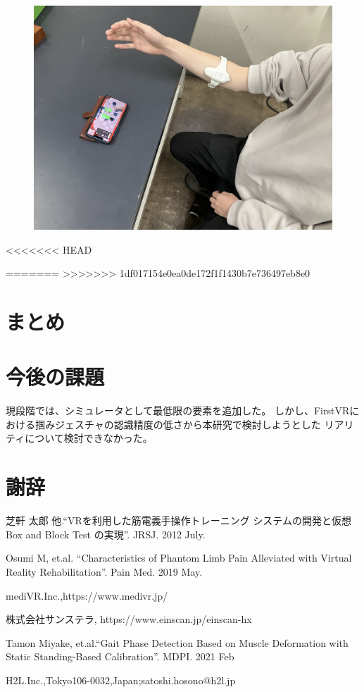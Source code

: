\documentclass{ltjsreport}
\begin{document}
		\begin{figure}[H]
		\centering
		\includegraphics[width = 12cm]{../figs/IMG_6323.jpg}
		\caption{}
		\label{}
		\end{figure}
<<<<<<< HEAD

=======
>>>>>>> 1df017154e0ea0de172f1f1430b7e736497eb8e0

\chapter{まとめ}

\chapter{今後の課題}
	現段階では、シミュレータとして最低限の要素を追加した。
	しかし、FirstVRにおける掴みジェスチャの認識精度の低さから本研究で検討しようとした
	リアリティについて検討できなかった。
\clearpage

\chapter*{謝辞}

\begin{thebibliography}{99}

	芝軒 太郎 他.``VRを利用した筋電義手操作トレーニング
	システムの開発と仮想 Box and Block Test の実現''.
	JRSJ. 2012 July.

	Osumi M, et.al.
	``Characteristics of Phantom Limb Pain Alleviated
	with Virtual Reality Rehabilitation''.
	Pain Med. 2019 May.

	mediVR.Inc.,https://www.medivr.jp/
	

	株式会社サンステラ, https://www.einscan.jp/einscan-hx
	
	Tamon Miyake, et.al.``Gait Phase Detection Based on Muscle Deformation
	with Static Standing-Based Calibration''.
	MDPI. 2021 Feb


	H2L.Inc.,Tokyo106-0032,Japan;satoshi.hosono@h2l.jp



\end{thebibliography}
\end{document}
